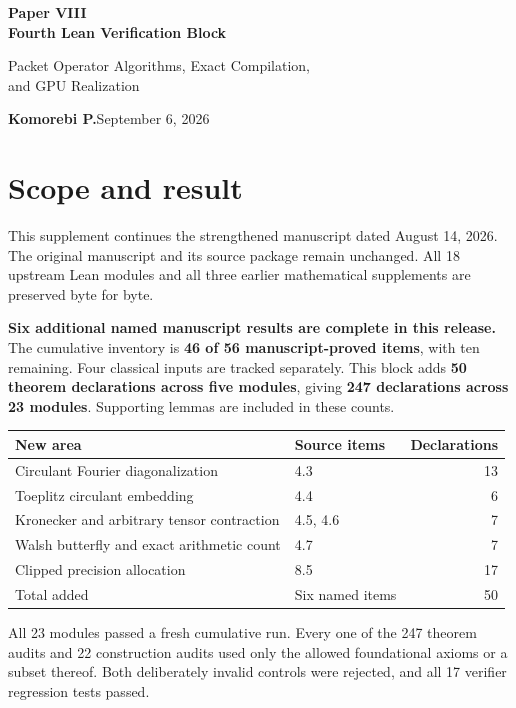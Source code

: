 \documentclass[11pt]{article}
\begin{document}
{\LARGE\bfseries\color{ink} Paper VIII\\[3pt] Fourth Lean Verification Block}\par
{\large Packet Operator Algorithms, Exact Compilation,\\and GPU Realization}\par
\textbf{Komorebi P.}\hfill September 6, 2026

\section*{\color{ink}Scope and result}
This supplement continues the strengthened manuscript dated August 14, 2026. The original manuscript and its source package remain unchanged. All 18 upstream Lean modules and all three earlier mathematical supplements are preserved byte for byte.

\textbf{Six additional named manuscript results are complete in this release.} The cumulative inventory is \textbf{46 of 56 manuscript-proved items}, with ten remaining. Four classical inputs are tracked separately. This block adds \textbf{50 theorem declarations across five modules}, giving \textbf{247 declarations across 23 modules}. Supporting lemmas are included in these counts.

\begin{center}\small
\renewcommand{\arraystretch}{1.3}
\begin{tabular}{@{}p{}p{}r@{}}
\toprule
New area & Source items & Declarations\\
\midrule
Circulant Fourier diagonalization & 4.3 & 13\\
Toeplitz circulant embedding & 4.4 & 6\\
Kronecker and arbitrary tensor contraction & 4.5, 4.6 & 7\\
Walsh butterfly and exact arithmetic count & 4.7 & 7\\
Clipped precision allocation & 8.5 & 17\\
\midrule
Total added & Six named items & 50\\
\bottomrule
\end{tabular}
\end{center}

All 23 modules passed a fresh cumulative run. Every one of the 247 theorem audits and 22 construction audits used only the allowed foundational axioms or a subset thereof. Both deliberately invalid controls were rejected, and all 17 verifier regression tests passed.
\end{document}
